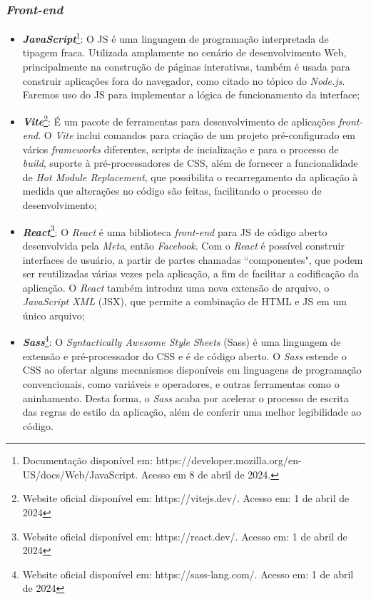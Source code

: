 \subsubsection{\textit{Front-end}}
\begin{itemize}
    \item \textbf{\textit{JavaScript}}\footnote{Documentação disponível em: https://developer.mozilla.org/en-US/docs/Web/JavaScript. Acesso em 8 de abril de 2024.}: O JS é uma linguagem de programação interpretada de tipagem fraca. Utilizada amplamente no cenário de desenvolvimento Web, principalmente na construção de páginas interativas, também é usada para construir aplicações fora do navegador, como citado no tópico do \textit{Node.js}. Faremos uso do JS para implementar a lógica de funcionamento da interface;
    \item \textbf{\textit{Vite}}\footnote{Website oficial disponível em: https://vitejs.dev/. Acesso em: 1 de abril de 2024}: É um pacote de ferramentas para desenvolvimento de aplicações \textit{front-end}. O \textit{Vite} inclui comandos para criação de um projeto pré-configurado em vários \textit{frameworks} diferentes, scripts de incialização e para o processo de \textit{build}, suporte à pré-processadores de CSS, além de fornecer a funcionalidade de \textit{Hot Module Replacement}, que possibilita o recarregamento da aplicação à medida que alterações no código são feitas, facilitando o processo de desenvolvimento;
    \item \textbf{\textit{React}}\footnote{Website oficial disponível em: https://react.dev/. Acesso em: 1 de abril de 2024}: O \textit{React} é uma biblioteca \textit{front-end} para JS de código aberto desenvolvida pela \textit{Meta}, então \textit{Facebook}. Com o \textit{React} é possível construir interfaces de usuário, a partir de partes chamadas “componentes", que podem ser reutilizadas várias vezes pela aplicação, a fim de facilitar a codificação da aplicação. O \textit{React} também introduz uma nova extensão de arquivo, o \textit{JavaScript XML} (JSX), que permite a combinação de HTML e JS em um único arquivo;
    
    \item \textbf{\textit{Sass}}\footnote{Website oficial disponível em: https://sass-lang.com/. Acesso em: 1 de abril de 2024}: O \textit{Syntactically Awesome Style Sheets} (Sass) é uma linguagem de extensão e pré-processador do CSS e é de código aberto. O \textit{Sass} estende o CSS ao ofertar alguns mecanismos disponíveis em linguagens de programação convencionais, como variáveis e operadores, e outras ferramentas como o aninhamento. Desta forma, o \textit{Sass} acaba por acelerar o processo de escrita das regras de estilo da aplicação, além de conferir uma melhor legibilidade ao código.
\end{itemize}

